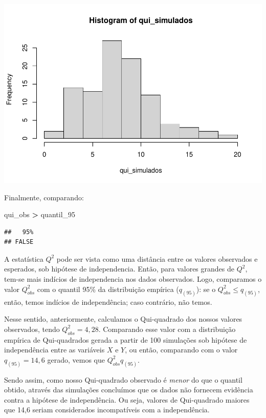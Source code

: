 \documentclass[
]{book}
\newenvironment{Shaded}{\begin{snugshade}}{\end{snugshade}}
\newcommand{\NormalTok}[1]{#1}
\newcommand{\SpecialCharTok}[1]{\textcolor[rgb]{0.81,0.36,0.00}{\textbf{#1}}}
\begin{document}
\begin{center}\includegraphics{AED_files/figure-latex/hist_qui-1} \end{center}

Finalmente, comparando:

\begin{Shaded}
\begin{Highlighting}[]
\NormalTok{qui\_obs }\SpecialCharTok{\textgreater{}}\NormalTok{ quantil\_95}
\end{Highlighting}
\end{Shaded}

\begin{verbatim}
##   95% 
## FALSE
\end{verbatim}

A estatística \(Q^2\) pode ser vista como uma distância entre os valores observados e esperados, sob hipótese de independencia. Então, para valores grandes de \(Q^2\), tem-se mais indícios de independencia nos dados observados. Logo, comparamos o valor \(Q_{obs}^2\) com o quantil 95\% da distribuição empírica (\(q_{(95)}\)): se o \(Q_{obs}^2 \leq q_{(95)}\), então, temos indícios de independência; caso contrário, não temos.

Nesse sentido, anteriormente, calculamos o Qui-quadrado dos nossos valores observados, tendo \(Q_{obs}^2 = 4,28\). Comparando esse valor com a distribuição empírica de Qui-quadrados gerada a partir de 100 simulações sob hipótese de independência entre as variáveis \(X\) e \(Y\), ou então, comparando com o valor \(q_{(95)} = 14,6\) gerado, vemos que \(Q_{obs}^2  q_{(95)}\).

Sendo assim, como nosso Qui-quadrado observado é \emph{menor} do que o quantil obtido, através das simulações concluímos que os dados não fornecem evidência contra a hipótese de independência. Ou seja, valores de Qui-quadrado maiores que 14,6 seriam considerados incompatíveis com a independência.
\end{document}
